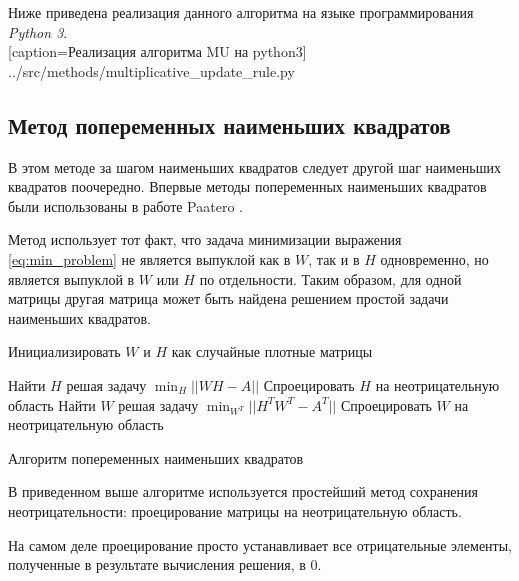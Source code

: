 \newpage

Ниже приведена реализация данного алгоритма на языке программирования \textit{Python 3}.
\\


  [caption=Реализация алгоритма MU на python3]
  {../src/methods/multiplicative_update_rule.py}



\newpage



\subsection{Метод попеременных наименьших квадратов}

В этом методе за шагом наименьших квадратов следует другой шаг наименьших квадратов поочередно.
Впервые методы попеременных наименьших квадратов были использованы в работе Paatero \cite{paatero}.

Метод использует тот факт, что задача минимизации выражения \eqref{eq:min_problem} не является выпуклой как в $W$,
так и в $H$ одновременно, но является выпуклой в $W$ или $H$ по отдельности.
Таким образом, для одной матрицы другая матрица может быть найдена решением простой задачи наименьших квадратов.

\begin{algorithm}
  \BlankLine
  \BlankLine


  \BlankLine

  Инициализировать  $W$ и $H$ как случайные плотные матрицы\;

   {
    Найти $H$ решая задачу $\displaystyle\min_H||WH - A||$\; \label{alg:line:lstsq_1}
    Спроецировать $H$ на неотрицательную область\;
    Найти $W$ решая задачу $\displaystyle\min_{W^T}||H^TW^T - A^T||$\; \label{alg:line:lstsq_2}
    Спроецировать $W$ на неотрицательную область\;
  }

  \BlankLine

  \caption{Алгоритм попеременных наименьших квадратов}
\end{algorithm}

В приведенном выше алгоритме используется простейший метод сохранения неотрицательности:
проецирование матрицы на неотрицательную область.

На самом деле проецирование просто устанавливает все отрицательные элементы, полученные в результате
вычисления решения, в $0$.

